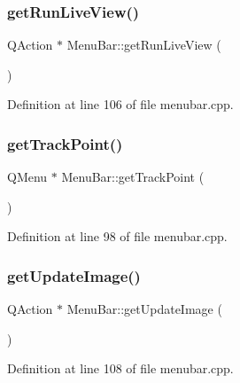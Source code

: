 \mbox{\label{class_menu_bar_a35380bc71e90a3e8388443b78237841d}} 
\subsubsection{\texorpdfstring{getRunLiveView()}{getRunLiveView()}}
{\footnotesize\ttfamily Q\+Action $\ast$ Menu\+Bar\+::get\+Run\+Live\+View (\begin{DoxyParamCaption}{ }\end{DoxyParamCaption})}



Definition at line 106 of file menubar.\+cpp.

\mbox{\label{class_menu_bar_a85c0c7e40d4caed15743334cb140504f}} 
\subsubsection{\texorpdfstring{getTrackPoint()}{getTrackPoint()}}
{\footnotesize\ttfamily Q\+Menu $\ast$ Menu\+Bar\+::get\+Track\+Point (\begin{DoxyParamCaption}{ }\end{DoxyParamCaption})}



Definition at line 98 of file menubar.\+cpp.

\mbox{\label{class_menu_bar_a6142d743b852d8adde210069dffad316}} 
\subsubsection{\texorpdfstring{getUpdateImage()}{getUpdateImage()}}
{\footnotesize\ttfamily Q\+Action $\ast$ Menu\+Bar\+::get\+Update\+Image (\begin{DoxyParamCaption}{ }\end{DoxyParamCaption})}



Definition at line 108 of file menubar.\+cpp.

\mbox{\label{class_menu_bar_a3054783db94c3d09f6fad6c0305a995b}} 
